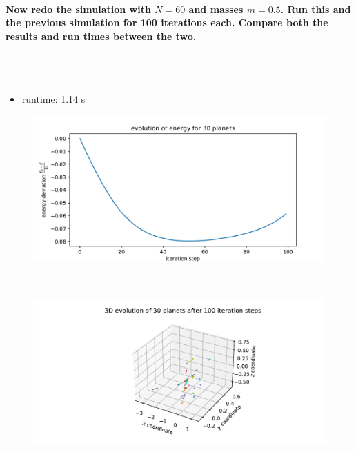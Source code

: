     \paragraph{Now redo the simulation with $N=60$ and masses $m=0.5$. Run this and 
        the previous simulation for 100 iterations each. Compare both the 
        results and run times between the two.
        } \ \\
        \\
        \begin{itemize}
            \item runtime: 1.14 s
        \end{itemize}
        \begin{figure}[h!]
            \centering
            \includegraphics[width=\textwidth]{./figures/task2_30body_energy_new_d.pdf}
        \end{figure} \ \\ 
        \begin{figure}[h!]
            \centering
            \includegraphics[width=\textwidth]{./figures/task2_30body_3D_new_d.pdf}
        \end{figure} \ \\ 


